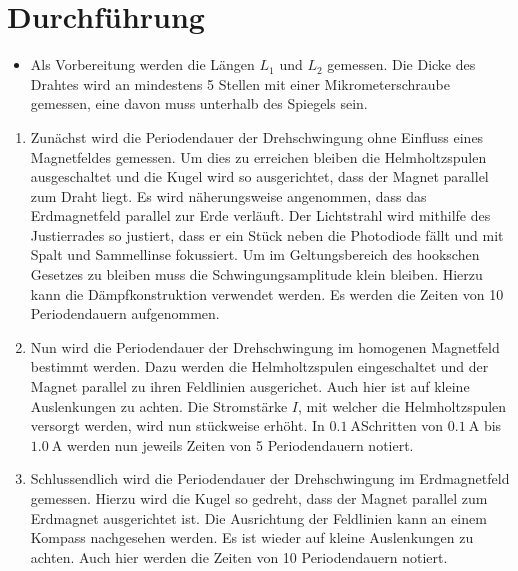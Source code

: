 
\section{Durchführung}
\label{sec:Durchführung}

\begin{itemize}
   \item Als Vorbereitung werden die Längen $L_1$ und $L_2$ gemessen. Die Dicke des
   Drahtes wird an mindestens 5 Stellen mit einer Mikrometerschraube gemessen,
   eine davon muss unterhalb des Spiegels sein.
\end{itemize}
\renewcommand{\labelenumi}{\alph{enumi})}

\begin{enumerate}
  \item Zunächst wird die Periodendauer der Drehschwingung ohne Einfluss
   eines Magnetfeldes gemessen. Um dies zu erreichen bleiben die Helmholtzspulen
    ausgeschaltet und die Kugel wird so ausgerichtet, dass der Magnet parallel zum Draht
    liegt. Es wird näherungsweise angenommen, dass das Erdmagnetfeld parallel zur Erde
    verläuft. Der Lichtstrahl wird mithilfe des Justierrades so justiert,
     dass er ein Stück neben die Photodiode fällt und mit Spalt und Sammellinse
      fokussiert. Um im Geltungsbereich des hookschen Gesetzes zu bleiben muss
       die Schwingungsamplitude klein bleiben. Hierzu kann die Dämpfkonstruktion
        verwendet werden. Es werden die Zeiten von 10 Periodendauern aufgenommen.

        \item Nun wird die Periodendauer der Drehschwingung im
         homogenen Magnetfeld bestimmt werden. Dazu werden die Helmholtzspulen
          eingeschaltet und der Magnet parallel zu ihren Feldlinien ausgerichet.
           Auch hier ist auf kleine Auslenkungen zu achten.
          Die Stromstärke $I$, mit welcher die Helmholtzspulen versorgt werden,
           wird nun stückweise erhöht. In $\SI{0.1}{\ampere}$Schritten von
           $\SI{0.1}{\ampere}$ bis $\SI{1.0}{\ampere}$ werden nun jeweils
Zeiten von 5 Periodendauern notiert.

      \item Schlussendlich wird die Periodendauer der Drehschwingung im Erdmagnetfeld gemessen.
       Hierzu wird die Kugel so gedreht, dass der Magnet parallel zum Erdmagnet
        ausgerichtet ist. Die Ausrichtung der Feldlinien kann an einem Kompass
         nachgesehen werden. Es ist wieder auf kleine Auslenkungen zu achten.
          Auch hier werden die Zeiten von 10 Periodendauern notiert.



\end{enumerate}

